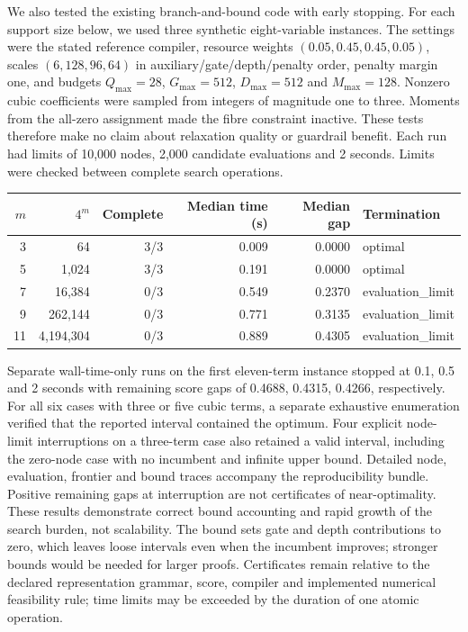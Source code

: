 \documentclass[a4paper,onecolumn,11pt,unpublished]{quantumarticle}
\theoremstyle{remark}
\begin{document}
We also tested the existing branch-and-bound code with early stopping.
For each support size below, we used three synthetic eight-variable instances.
The settings were the stated reference compiler, resource weights
$(0.05,0.45,0.45,0.05)$, scales $(6,128,96,64)$ in
auxiliary/gate/depth/penalty order, penalty margin one, and budgets
$Q_{\max}=28$, $G_{\max}=512$, $D_{\max}=512$ and $M_{\max}=128$.
Nonzero cubic coefficients were sampled from integers of magnitude one to
three. Moments from the all-zero assignment made the fibre constraint
inactive. These tests therefore make no claim about relaxation quality or
guardrail benefit. Each run had limits of 10,000 nodes, 2,000 candidate
evaluations and 2 seconds. Limits were checked between complete search
operations.
\begin{center}\begin{tabular}{rrrrrl}
\toprule
$m$ & $4^m$ & Complete & Median time (s) & Median gap & Termination\\
\midrule
3 & 64 & 3/3 & 0.009 & 0.0000 & optimal\\
5 & 1,024 & 3/3 & 0.191 & 0.0000 & optimal\\
7 & 16,384 & 0/3 & 0.549 & 0.2370 & evaluation\_limit\\
9 & 262,144 & 0/3 & 0.771 & 0.3135 & evaluation\_limit\\
11 & 4,194,304 & 0/3 & 0.889 & 0.4305 & evaluation\_limit\\
\bottomrule\end{tabular}\end{center}
Separate wall-time-only runs on the first eleven-term instance stopped at
0.1, 0.5 and 2 seconds with remaining score gaps of 0.4688, 0.4315, 0.4266, respectively.
For all six cases with three or five cubic terms, a separate exhaustive enumeration
verified that the reported interval contained the optimum. Four explicit node-limit
interruptions on a three-term case also retained a valid interval, including the
zero-node case with no incumbent and infinite upper bound. Detailed node, evaluation,
frontier and bound traces accompany the reproducibility bundle. Positive remaining
gaps at interruption are not certificates of near-optimality. These results demonstrate
correct bound accounting and rapid growth of the search burden, not scalability.
The bound sets gate and depth contributions to zero, which leaves loose intervals
even when the incumbent improves; stronger bounds would be needed for larger proofs.
Certificates remain relative to the declared representation grammar, score, compiler
and implemented numerical feasibility rule; time limits may be exceeded by the duration
of one atomic operation.
\end{document}
